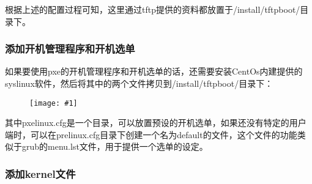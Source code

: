 \documentclass[a4paper,left=2.5cm,right=2.5cm,11pt]{article}
\newcommand{\fic}[1]{\begin{figure}[H]
		\center
		\texttt{[image: \#1]}
	\end{figure}}
\begin{document}
	根据上述的配置过程可知，这里通过tftp提供的资料都放置于/install/tftpboot/目录下。\par

\subsubsection{添加开机管理程序和开机选单}
	如果要使用pxe的开机管理程序和开机选单的话，还需要安装CentOs内建提供的syslinux软件，然后将其中的两个文件拷贝到/install/tftpboot/目录下：
	\fic{3.png}

	其中pxelinux.cfg是一个目录，可以放置预设的开机选单，如果还没有特定的用户端时，可以在prelinux.cfg目录下创建一个名为default的文件，这个文件的功能类似于grub的menu.lst文件，用于提供一个选单的设定。

\subsubsection{添加kernel文件}
	
\end{document}
